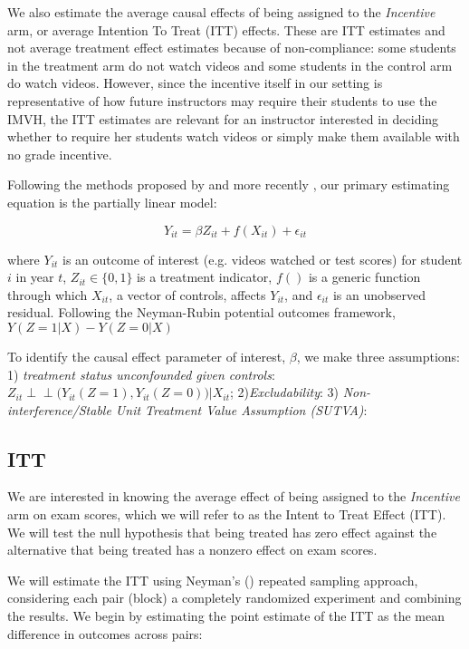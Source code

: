 \documentclass[12pt]{article}
\begin{document}
We also estimate the average causal effects of being assigned to the \textit{Incentive} arm, or average Intention To Treat (ITT) effects. These are ITT estimates and not average treatment effect estimates because of non-compliance: some students in the treatment arm do not watch videos and some students in the control arm do watch videos. However, since the incentive itself in our setting is representative of how future instructors may require their students to use the IMVH, the ITT estimates are relevant for an instructor interested in deciding whether to require her students watch videos or simply make them available with no grade incentive.

Following the methods proposed by \textcite{robinson1988} and more recently \textcite{wa2018}, our primary estimating equation is the partially linear model:

\begin{equation}
	Y_{it} = \beta Z_{it} + f(X_{it}) + \epsilon_{it}
\end{equation}

where $Y_{it}$ is an outcome of interest (e.g. videos watched or test scores) for student $i$ in year $t$, $Z_{it} \in \{0,1\}$ is a treatment indicator, $f()$ is a generic function through which $X_{it}$, a vector of controls, affects $Y_{it}$, and $\epsilon_{it}$ is an unobserved residual. Following the Neyman-Rubin potential outcomes framework, $Y(Z=1|X) - Y(Z=0|X)$

To identify the causal effect parameter of interest, $\beta$, we make three assumptions: 1) \textit{treatment status unconfounded given controls}: $Z_{it} \perp \!\!\! \perp \Big(Y_{it}(Z=1), Y_{it}(Z=0)\Big) \Big| X_{it}$; 2)\textit{Excludability}: 3) \textit{Non-interference/Stable Unit Treatment Value Assumption (SUTVA)}:



\subsection{ITT}

We are interested in knowing the average effect of being assigned to the \textit{Incentive} arm on exam scores, which we will refer to as the Intent to Treat Effect (ITT). We will test the null hypothesis that being treated has zero effect against the alternative that being treated has a nonzero effect on exam scores. %

We will estimate the ITT using Neyman's (\citeyear{neyman1923}) repeated sampling approach, considering each pair (block) a completely randomized experiment and combining the results. We begin by estimating the point estimate of the ITT as the mean difference in outcomes across pairs:
\end{document}
